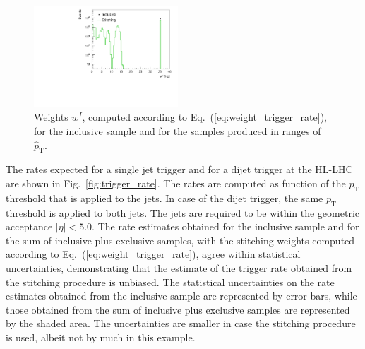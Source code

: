 \documentclass[twocolumn,epjc3]{svjour3}
\newcommand{\pT}{\ensuremath{p_{\textrm{T}}}\xspace}
\newcommand{\pThat}{\ensuremath{\hat{p}_{\textrm{T}}}\xspace}
\begin{document}
\begin{figure}
\includegraphics[width=0.48\textwidth]{plots/makeEvtWeightPlotsForPaper_evtWeight_log.pdf}
\caption{
  Weights $w^{I}$, computed according to Eq.~(\ref{eq:weight_trigger_rate}), 
  for the inclusive sample and for the samples produced in ranges of $\pThat$.
}
\label{fig:weight_trigger_rate}
\end{figure}

The rates expected for a single jet trigger and for a dijet trigger at the HL-LHC are shown in Fig.~\ref{fig:trigger_rate}.
The rates are computed as function of the $\pT$ threshold that is applied to the jets. 
In case of the dijet trigger, the same $\pT$ threshold is applied to both jets.
The jets are required to be within the geometric acceptance $\vert\eta\vert < 5.0$.
The rate estimates obtained for the inclusive sample and for the sum of inclusive plus exclusive samples, 
with the stitching weights computed according to Eq.~(\ref{eq:weight_trigger_rate}),
agree within statistical uncertainties, demonstrating that the estimate of the trigger rate obtained from the stitching procedure is unbiased.
The statistical uncertainties on the rate estimates obtained from the inclusive sample are represented by error bars,
while those obtained from the sum of inclusive plus exclusive samples are represented by the shaded area.
The uncertainties are smaller in case the stitching procedure is used, albeit not by much in this example.
\end{document}
